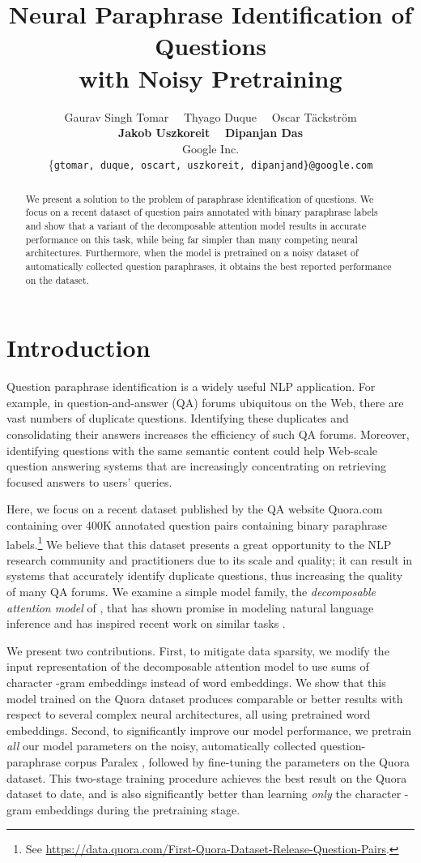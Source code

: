 \documentclass[11pt,letterpaper]{article}
\title{Neural Paraphrase Identification of Questions\\with Noisy Pretraining}
\author{Gaurav Singh Tomar \ \ Thyago Duque \ \ Oscar T{\"{a}}ckstr{\"{o}}m \\ {\bf Jakob Uszkoreit} \ \ {\bf Dipanjan Das}\\Google Inc.\\ \{\texttt{gtomar, duque, oscart, uszkoreit, dipanjand\}}\texttt{@google.com}}
\date{}
\begin{document}
\maketitle

\begin{abstract}
We present a solution to the problem of paraphrase identification of questions.
We focus on a recent dataset of question pairs annotated with binary paraphrase labels and show that a variant of the decomposable attention model \cite{parikh.etal.2016} results in accurate performance on this task, while being far simpler than many competing neural architectures.
Furthermore, when the model is pretrained on a noisy dataset of automatically collected question paraphrases, it obtains the best reported performance on the dataset.
\end{abstract}

\section{Introduction}
Question paraphrase identification is a widely useful NLP application.
For example, in question-and-answer (QA) forums ubiquitous on the Web, there are vast numbers of duplicate questions.
Identifying these duplicates and consolidating their answers increases the efficiency of such QA forums.
Moreover, identifying questions with the same semantic content could help Web-scale question answering systems that are increasingly concentrating on retrieving focused answers to users' queries.

Here, we focus on a recent dataset published by the QA website Quora.com containing over 400K annotated question pairs containing binary paraphrase labels.\footnote{See \url{https://data.quora.com/First-Quora-Dataset-Release-Question-Pairs}.}  We believe that this dataset presents a great opportunity to the NLP research community and practitioners due to its scale and quality; it can result in systems that accurately identify duplicate questions, thus increasing the quality of many QA forums.  We examine a simple model family, the \emph{decomposable attention model} of , that has shown promise in modeling natural language inference and has inspired recent work on similar tasks \cite{ChenZLWJ16,kim:iclr2017}.

We present two contributions.  First, to mitigate data sparsity, we modify the input representation of the decomposable attention model to use sums of character -gram embeddings instead of word embeddings.  We show that this model trained on the Quora dataset produces comparable or better results with respect to several complex neural architectures, all using pretrained word embeddings.  Second, to significantly improve our model performance, we pretrain \textit{all} our model parameters on the noisy, automatically collected question-paraphrase corpus Paralex \cite{paralex}, followed by fine-tuning the parameters on the Quora dataset.  This two-stage training procedure achieves the best result on the Quora dataset to date, and is also significantly better than learning \textit{only} the character -gram embeddings during the pretraining stage.
\end{document}
